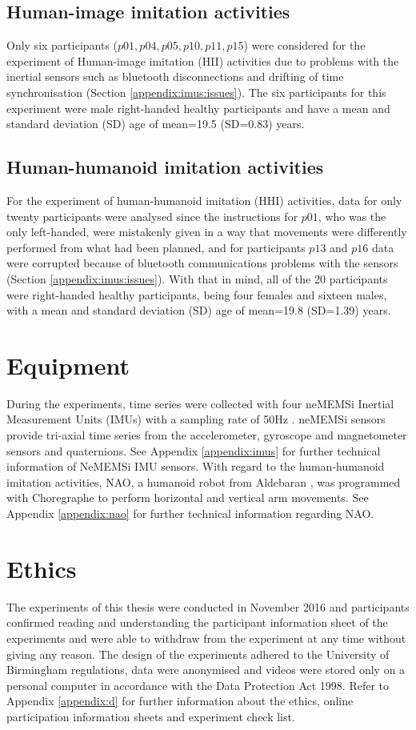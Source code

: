 \subsection{Human-image imitation activities}
Only six participants ($p01, p04, p05, p10, p11, p15$) were considered 
for the experiment of Human-image imitation (HII) activities due to  
problems with the inertial sensors such as bluetooth disconnections and
drifting of time synchronisation (Section \ref{appendix:imus:issues}).
The six participants for this experiment were male right-handed 
healthy participants and have a mean and standard deviation (SD) 
age of mean=19.5 (SD=0.83) years.

\subsection{Human-humanoid imitation activities}
For the experiment of human-humanoid imitation (HHI) activities, 
data for only twenty participants were analysed since the instructions 
for $p01$, who was the only left-handed, were mistakenly given in a way 
that movements were differently performed from what had been planned, 
and for participants $p13$ and $p16$ data were corrupted because of  
bluetooth communications problems with the sensors 
(Section \ref{appendix:imus:issues}).
With that in mind, all of the 20 participants were right-handed 
healthy participants, being four females and sixteen males, with 
a mean and standard deviation (SD) age of mean=19.8 (SD=1.39) years.

\section{Equipment}
During the experiments, time series were collected with four neMEMSi 
Inertial Measurement Units (IMUs) with a sampling rate of 50Hz 
\citep{Comotti2014}. neMEMSi sensors provide tri-axial time series from 
the accelerometer, gyroscope and magnetometer sensors and quaternions.
See Appendix \ref{appendix:imus} for further technical information of 
NeMEMSi IMU sensors.
With regard to the human-humanoid imitation activities, NAO, 
a humanoid robot from Aldebaran \citep{gouaillier2009}, 
was programmed with Choregraphe to perform horizontal and vertical 
arm movements.
See Appendix \ref{appendix:nao} for further technical information 
regarding NAO.

\section{Ethics}
The experiments of this thesis were conducted in November 2016 and
participants confirmed reading and understanding the participant information 
sheet of the experiments and were able to withdraw from the experiment 
at any time without giving any reason.
The design of the experiments adhered to the University of Birmingham 
regulations, data were anonymised and videos were stored 
only on a personal computer in accordance with the Data Protection Act 1998.
Refer to Appendix \ref{appendix:d} for further information about the 
ethics, online participation information sheets and experiment check list.


